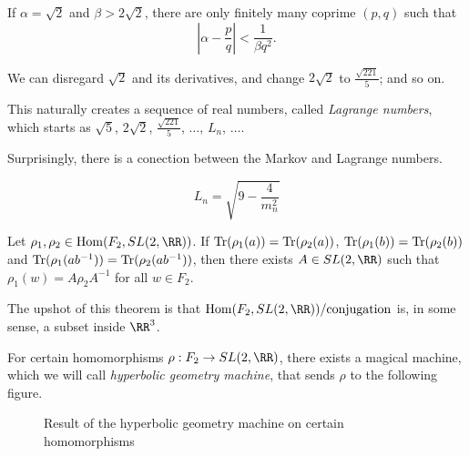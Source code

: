 \begin{thm}
	If $\alpha = \sqrt{2}$ and $\beta > 2\sqrt{2}$, there are only finitely many coprime  $(p, q)$ such that \[
		\left|\alpha - \frac{p}{q}\right| < \frac{1}{\beta q^2}.	
	\]
\end{thm}

We can disregard $\sqrt{2}$ and its derivatives, and change $2\sqrt{2}$ to $\frac{\sqrt{221}}{5}$; and so on.

This naturally creates a sequence of real numbers, called \emph{Lagrange numbers}, which starts as $\sqrt{5}$, $2\sqrt{2}$, $\frac{\sqrt{221}}{5}$, $\dots$, $L_n$, $\dots$.


Surprisingly, there is a conection between the Markov and Lagrange numbers.

\begin{thm}[Markov]
	\[
		L_n = \sqrt{9 - \frac{4}{m_n^2}}
	\]
\end{thm}


\begin{thm}
	Let $\rho_1, \rho_2 \in \Hom(F_2, SL(2, \RR))$. If  $\operatorname{Tr}(\rho_1(a)) = \operatorname{Tr}(\rho_2(a))$, $\operatorname{Tr}(\rho_1(b)) = \operatorname{Tr}(\rho_2(b))$ and $\operatorname{Tr}(\rho_1(ab^{-1})) = \operatorname{Tr}(\rho_2(ab^{-1}))$, then there exists $A \in SL(2, \RR)$ such that $\rho_1(w) = A \rho_2 A^{-1}$ for all $w \in F_2$.
\end{thm}

The upshot of this theorem is that $\Hom(F_2, SL(2, \RR)) / \text{conjugation}$ is, in some sense, a subset inside $\RR^3$.

For certain homomorphisms $\rho: F_2 \to SL(2, \RR)$, there exists a magical machine, which we will call \emph{hyperbolic geometry machine}, that sends $\rho$ to the following figure.

\begin{figure}[ht]
    \centering
    \caption{Result of the hyperbolic geometry machine on certain homomorphisms}
    \label{fig:hyperbolic-geometry-machine-of-certain-homomorphisms}
\end{figure}

